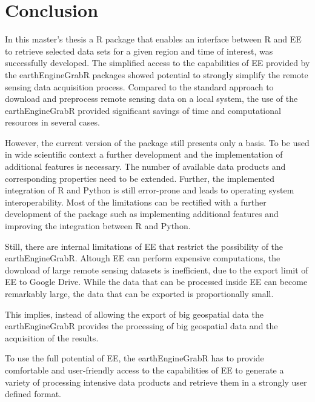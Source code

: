 
\chapter{Conclusion}


In this master's thesis a R package that enables an interface between R and EE to retrieve selected data sets for a given region and time of interest, was successfully developed. The simplified access to the capabilities of EE provided by the earthEngineGrabR packages showed potential to strongly simplify the remote sensing data acquisition process. Compared to the standard approach to download and preprocess remote sensing data on a local system, the use of the earthEngineGrabR provided significant savings of time and computational resources in several cases. 

However, the current version of the package still presents only a basis. To be used in wide scientific context a further development and the implementation of additional features is necessary. 
The number of available data products and corresponding properties need to be extended.
Further, the implemented integration of R and Python is still error-prone and leads to operating system interoperability.  
Most of the limitations can be rectified with a further development of the package such as implementing additional features and improving the integration between R and Python.

Still, there are internal limitations of EE that restrict the possibility of the earthEngineGrabR. Altough EE can perform expensive computations, the download of large remote sensing datasets is inefficient, due to the export limit of EE to Google Drive. 
While the data that can be processed inside EE can become remarkably large, the data that can be exported is proportionally small.

This implies, instead of allowing the export of big geospatial data the earthEngineGrabR provides the processing of big geospatial data and the acquisition of the results.

To use the full potential of EE, the earthEngineGrabR has to provide comfortable and user-friendly access to the capabilities of EE to generate a variety of processing intensive data products and retrieve them in a strongly user defined format.



